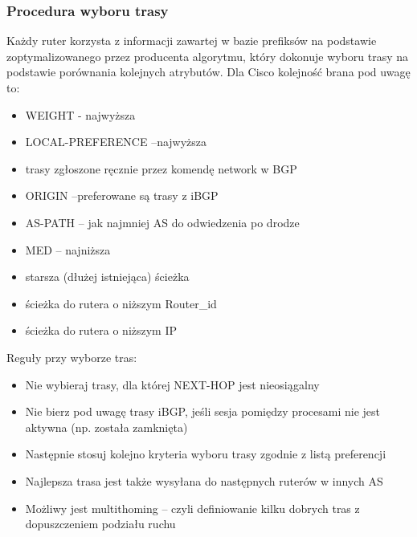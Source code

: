 \documentclass[a4paper, 12pt, titlepage]{article}
\begin{document}
			\subsubsection{Procedura wyboru trasy}
				Każdy ruter korzysta z informacji zawartej w bazie prefiksów na podstawie zoptymalizowanego przez producenta algorytmu, który dokonuje wyboru trasy na podstawie porównania kolejnych atrybutów. Dla Cisco kolejność brana pod uwagę to:
				\begin{itemize}
					\item WEIGHT - najwyższa
					\item LOCAL-PREFERENCE --najwyższa
					\item trasy zgłoszone ręcznie przez komendę network w BGP
					\item ORIGIN --preferowane są trasy z iBGP
					\item AS-PATH -- jak najmniej AS do odwiedzenia po drodze
					\item MED -- najniższa 
					\item starsza (dłużej istniejąca) ścieżka
					\item ścieżka do rutera o niższym Router\_id
					\item ścieżka do rutera o niższym IP
				\end{itemize}
				Reguły przy wyborze tras:
				\begin{itemize}
					\item Nie wybieraj trasy, dla której NEXT-HOP jest nieosiągalny
					\item Nie bierz pod uwagę trasy iBGP, jeśli sesja pomiędzy procesami nie jest aktywna (np. została zamknięta)
					\item Następnie stosuj kolejno kryteria wyboru trasy zgodnie z listą preferencji
					\item Najlepsza trasa jest także wysyłana do następnych ruterów w innych AS
					\item Możliwy jest multithoming -- czyli definiowanie kilku dobrych tras z dopuszczeniem podziału ruchu
				\end{itemize}
\end{document}
